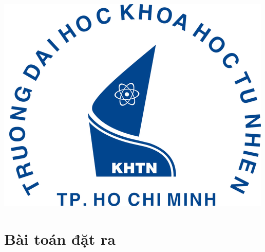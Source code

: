 \begin{titlepage}




\includegraphics{logo/rsz_3logo-khtn.png}\\[1cm] %
 

\vfill %

\end{titlepage}

\tableofcontents
\newpage

\section{Bài toán đặt ra}

